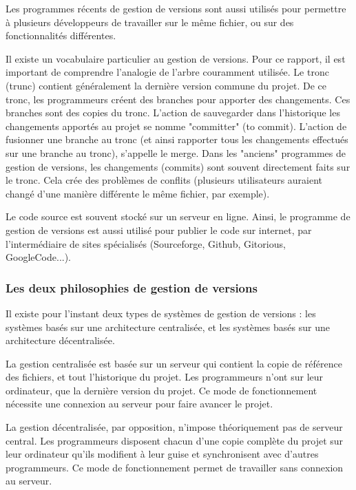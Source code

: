 Les programmes récents de gestion de versions sont aussi utilisés
pour permettre à plusieurs développeurs de travailler 
sur le même fichier, ou sur des fonctionnalités différentes.

Il existe un vocabulaire particulier au gestion de versions.
Pour ce rapport, il est important de comprendre l'analogie de l'arbre couramment utilisée.
Le tronc (trunc) contient généralement la dernière version commune du projet.
De ce tronc, les programmeurs créent des branches pour apporter des changements.
Ces branches sont des copies du tronc.
L'action de sauvegarder dans l'historique les changements apportés au projet se nomme "committer" (to commit).
L'action de fusionner une branche au tronc
(et ainsi rapporter tous les changements effectués sur une branche au tronc), s'appelle le merge.
Dans les  "anciens" programmes de gestion de versions,
les changements (commits) sont souvent directement faits sur le tronc.
Cela crée des problèmes de conflits
(plusieurs utilisateurs auraient changé d'une manière différente le même fichier, par exemple).

Le code source est souvent stocké sur un serveur en ligne.
Ainsi, le programme de gestion de versions est aussi utilisé
pour publier le code sur internet, par l'intermédiaire de sites spécialisés
(Sourceforge, Github, Gitorious, GoogleCode...).


\subsubsection{Les deux philosophies de gestion de versions} 

Il existe pour l'instant deux types de systèmes de gestion de versions : 
les systèmes basés sur une architecture centralisée,
et les systèmes basés sur une architecture décentralisée.

La gestion centralisée est basée sur un serveur qui contient la copie de référence des fichiers, 
et tout l'historique du projet. 
Les programmeurs n'ont sur leur ordinateur, que la dernière version du projet. 
Ce mode de fonctionnement nécessite une connexion au serveur pour faire avancer le projet.

La gestion décentralisée, par opposition, n'impose théoriquement pas de serveur central.
Les programmeurs disposent chacun d'une copie complète du projet sur leur ordinateur
qu'ils modifient à leur guise et synchronisent avec d'autres programmeurs.
Ce mode de fonctionnement permet de travailler sans connexion au serveur.

